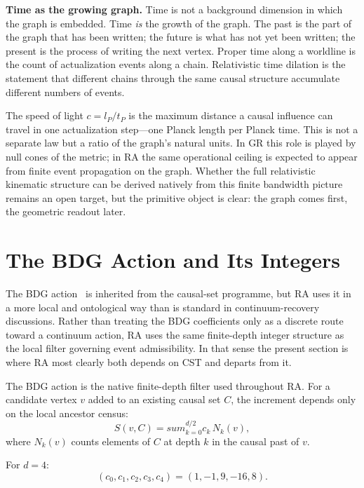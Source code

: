 \documentclass[11pt]{article}
\def\sum{sum}%
\begin{document}
\textbf{Time as the growing graph.} Time is not a background dimension in which the graph is embedded. Time \emph{is} the growth of the graph. The past is the part of the graph that has been written; the future is what has not yet been written; the present is the process of writing the next vertex. Proper time along a worldline is the count of actualization events along a chain. Relativistic time dilation is the statement that different chains through the same causal structure accumulate different numbers of events.

The speed of light $c=l_P/t_P$ is the maximum distance a causal influence can travel in one actualization step---one Planck length per Planck time. This is not a separate law but a ratio of the graph's natural units. In GR this role is played by null cones of the metric; in RA the same operational ceiling is expected to appear from finite event propagation on the graph. Whether the full relativistic kinematic structure can be derived natively from this finite bandwidth picture remains an open target, but the primitive object is clear: the graph comes first, the geometric readout later.

\section{The BDG Action and Its Integers}
\label{sec:bdg}

The BDG action~\cite{Benincasa2010} is inherited from the causal-set programme, but RA uses it in a more local and ontological way than is standard in continuum-recovery discussions. Rather than treating the BDG coefficients only as a discrete route toward a continuum action, RA uses the same finite-depth integer structure as the local filter governing event admissibility. In that sense the present section is where RA most clearly both depends on CST and departs from it.

The BDG action is the native finite-depth filter used throughout RA. For a candidate vertex $v$ added to an existing causal set $C$, the increment depends only on the local ancestor census:
\begin{equation}
S(v,C) = \sum_{k=0}^{d/2} c_k \, N_k(v),
\end{equation}
where $N_k(v)$ counts elements of $C$ at depth $k$ in the causal past of $v$.

For $d=4$:
\begin{equation}
\label{eq:bdg_d4}
(c_0,c_1,c_2,c_3,c_4)=(1,-1,9,-16,8).
\end{equation}
\end{document}
